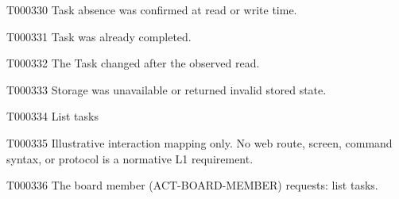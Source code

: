 \documentclass[11pt,a4paper]{article}
\begin{document}
\begin{atlasparagraph}{T000330}
Task absence was confirmed at read or write time.
\end{atlasparagraph}
\begin{atlasparagraph}{T000331}
Task was already completed.
\end{atlasparagraph}
\begin{atlasparagraph}{T000332}
The Task changed after the observed read.
\end{atlasparagraph}
\begin{atlasparagraph}{T000333}
Storage was unavailable or returned invalid stored state.
\end{atlasparagraph}
\begin{atlastext}{T000334}
List tasks
\end{atlastext}
\begin{atlasparagraph}{T000335}
Illustrative interaction mapping only. No web route, screen, command syntax, or protocol is a normative L1 requirement.
\end{atlasparagraph}
\begin{atlasparagraph}{T000336}
The board member (ACT-BOARD-MEMBER) requests: list tasks.
\end{atlasparagraph}
\end{document}
